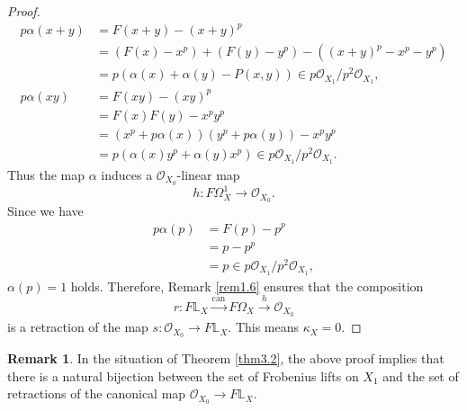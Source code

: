 \documentclass[11pt, a4paper]{amsart}
\theoremstyle{plain}
\theoremstyle{definition}
\newtheorem{remark}[theorem]{Remark}
\begin{document}
\begin{proof}
\begin{align*}
    p\alpha(x+y)&=F(x+y)-(x+y)^p\\&=(F(x)-x^p)+(F(y)-y^p)-((x+y)^p-x^p-y^p)\\&=p(\alpha(x)+\alpha(y)-P(x,y))\in p\mathcal O_{X_1}/p^2\mathcal O_{X_1},\\
    p\alpha(xy)&=F(xy)-(xy)^p\\&=F(x)F(y)-x^py^p\\&=(x^p+p\alpha(x))(y^p+p\alpha(y))-x^py^p\\&=p(\alpha(x)y^p+\alpha(y)x^p)\in p\mathcal O_{X_1}/p^2\mathcal O_{X_1}. 
\end{align*}
Thus the map $\alpha$ induces a $\mathcal O_{X_0}$-linear map \[h:F\Omega_{X}^1\to \mathcal O_{X_0}.\] Since we have \begin{align*}
    p\alpha(p)&=F(p)-p^p\\&=p-p^p\\&=p\in p\mathcal O_{X_1}/p^2\mathcal O_{X_1},
\end{align*} $\alpha(p)=1$ holds. Therefore, Remark \ref{rem1.6} ensures that the composition\[r:F\mathbb L_X\xrightarrow[]{\mathrm{can}}F\Omega_X\xrightarrow[]{h}\mathcal O_{X_0}\] is a retraction of the map $s:\mathcal O_{X_0}\to F\mathbb L_{X}$. This means $\kappa_X=0$.
\end{proof}

\begin{remark}\label{remA.1}
    In the situation of Theorem \ref{thm3.2}, the above proof implies that there is a natural bijection between the set of Frobenius lifts on $X_1$ and the set of retractions of the canonical map $\mathcal O_{X_0}\to F\mathbb L_X$.
\end{remark}
\end{document}
